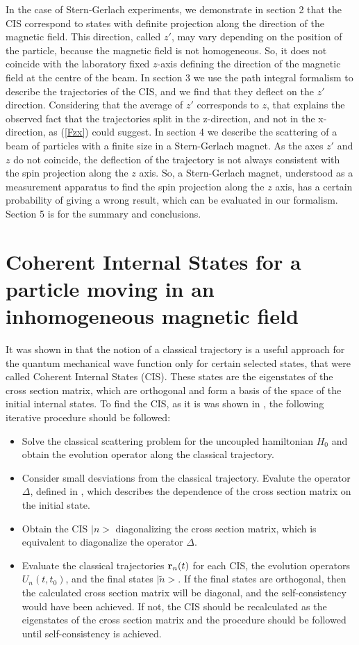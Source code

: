 In the case of Stern-Gerlach experiments, we demonstrate in section 2
that the CIS correspond to  states with definite projection along the 
direction of the magnetic field. This direction, called $z'$, may vary
depending on the position of the particle, because the magnetic field is not
homogeneous. So, it does not coincide with the laboratory fixed $z$-axis 
defining the
direction of the magnetic field at the centre of the beam. 
In section 3 we  use the path integral
formalism to describe the trajectories of the CIS, and we find that
they deflect on the $z'$ direction. Considering that the average of $z'$
corresponds to $z$, 
that explains the observed fact that 
the trajectories split in the z-direction, and not in the x-direction,
as (\ref{Fzx}) could suggest.
In section 4 we describe the scattering of a beam of particles with a 
finite size in a Stern-Gerlach magnet. As the axes $z'$ and $z$ do not
coincide,  the deflection of the trajectory is not always consistent with 
the spin projection along the $z$ axis. So, a Stern-Gerlach magnet, understood
as a measurement apparatus to find the spin projection along the $z$ axis,
has a certain probability  of giving a wrong result, which can be evaluated 
in our formalism. 
Section 5 is for the summary and 
conclusions.



\section{Coherent Internal States for  a particle moving in an inhomogeneous
 magnetic field}

It was shown in \cite{sara} that the notion of a classical trajectory is
a useful approach for the quantum mechanical wave function only for
certain selected states, that were called Coherent Internal States (CIS).
These states are the eigenstates of the cross section matrix, 
which are orthogonal and form a basis of the space of the initial internal 
states.
To find the CIS, as it is was shown in \cite{sara}, the 
following iterative procedure should be followed:
\begin{itemize}
\item Solve the classical scattering problem for the uncoupled 
hamiltonian $H_0$ and obtain the 
evolution operator along the classical trajectory. 
\item Consider small desviations from the classical 
trajectory. Evalute the operator $\Delta$, defined in \cite{2}, which
describes the dependence of the cross section matrix on the initial state.
\item Obtain the CIS $|n>$ diagonalizing the cross section matrix, which is
equivalent to diagonalize the operator $\Delta$. 
\item Evaluate the  classical trajectories ${\bf r}_n(t)$ for each CIS, 
the evolution operators $U_n(t,t_0)$, and the final states $|\tilde{n}>$.
If the final states are orthogonal, then the calculated cross section matrix 
will be diagonal, and the self-consistency would have been achieved. 
If not, the CIS should be  recalculated as the eigenstates of the cross section
matrix and the procedure should be followed until self-consistency is achieved.
\end{itemize}

